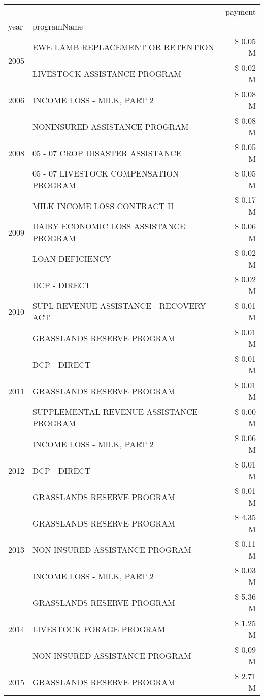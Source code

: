 \begin{tabular}{llr}
\toprule
 &  & payment \\
year & programName &  \\
\midrule
\multirow[t]{2}{*}{2005} & EWE LAMB REPLACEMENT OR RETENTION & \$ 0.05 M \\
 & LIVESTOCK ASSISTANCE PROGRAM & \$ 0.02 M \\
\cline{1-3}
2006 & INCOME LOSS - MILK, PART 2 & \$ 0.08 M \\
\cline{1-3}
\multirow[t]{3}{*}{2008} & NONINSURED ASSISTANCE PROGRAM & \$ 0.08 M \\
 & 05 - 07 CROP DISASTER ASSISTANCE & \$ 0.05 M \\
 & 05 - 07 LIVESTOCK COMPENSATION PROGRAM & \$ 0.05 M \\
\cline{1-3}
\multirow[t]{3}{*}{2009} & MILK INCOME LOSS CONTRACT II & \$ 0.17 M \\
 & DAIRY ECONOMIC LOSS ASSISTANCE PROGRAM & \$ 0.06 M \\
 & LOAN DEFICIENCY & \$ 0.02 M \\
\cline{1-3}
\multirow[t]{3}{*}{2010} & DCP - DIRECT & \$ 0.02 M \\
 & SUPL REVENUE ASSISTANCE - RECOVERY ACT & \$ 0.01 M \\
 & GRASSLANDS RESERVE PROGRAM & \$ 0.01 M \\
\cline{1-3}
\multirow[t]{3}{*}{2011} & DCP - DIRECT & \$ 0.01 M \\
 & GRASSLANDS RESERVE PROGRAM & \$ 0.01 M \\
 & SUPPLEMENTAL REVENUE ASSISTANCE PROGRAM & \$ 0.00 M \\
\cline{1-3}
\multirow[t]{3}{*}{2012} & INCOME LOSS - MILK, PART 2 & \$ 0.06 M \\
 & DCP - DIRECT & \$ 0.01 M \\
 & GRASSLANDS RESERVE PROGRAM & \$ 0.01 M \\
\cline{1-3}
\multirow[t]{3}{*}{2013} & GRASSLANDS RESERVE PROGRAM & \$ 4.35 M \\
 & NON-INSURED ASSISTANCE PROGRAM & \$ 0.11 M \\
 & INCOME LOSS - MILK, PART 2 & \$ 0.03 M \\
\cline{1-3}
\multirow[t]{3}{*}{2014} & GRASSLANDS RESERVE PROGRAM & \$ 5.36 M \\
 & LIVESTOCK FORAGE PROGRAM & \$ 1.25 M \\
 & NON-INSURED ASSISTANCE PROGRAM & \$ 0.09 M \\
\cline{1-3}
\multirow[t]{3}{*}{2015} & GRASSLANDS RESERVE PROGRAM & \$ 2.71 M \\

\end{tabular}
